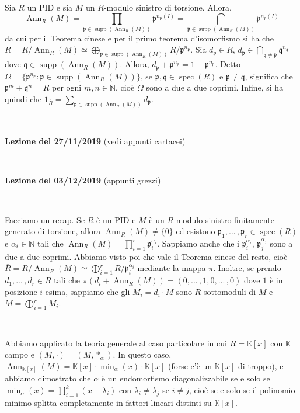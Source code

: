 \documentclass{article}
\theoremstyle{definition}
\newcommand{\Ann}{\operatorname{Ann}}
\newcommand{\spec}{\operatorname{spec}}
\begin{document}
\noindent Sia $R$ un PID e sia $M$ un $R$-modulo sinistro di torsione. Allora, \[\operatorname{Ann}_R(M)=\prod\limits_{\mathfrak{p}\in \operatorname{supp}(\Ann_R(M))} \mathfrak{p}^{n_{\mathfrak{p}}(I)}=\bigcap\limits_{\mathfrak{p}\in \operatorname{supp}(\Ann_R(M))} \mathfrak{p}^{n_{\mathfrak{p}}(I)}\] da cui per il Teorema cinese e per il primo teorema d'isomorfismo si ha che $\overline{R}=R/\Ann_R(M)\simeq \bigoplus\limits_{\mathfrak{p}\in \operatorname{supp}(\Ann_R(M))} R/\mathfrak{p}^{n_{\mathfrak{p}}}$. Sia $d_{\mathfrak{p}}\in \overline{R}$, $d_{\mathfrak{p}}\in \bigcap\limits_{\mathfrak{q}\neq \mathfrak{p}} \mathfrak{q}^{n_{\mathfrak{q}}}$ dove $\mathfrak{q}\in \operatorname{supp}(\Ann_R(M))$. Allora, $d_{\mathfrak{p}}+\mathfrak{p}^{n_{\mathfrak{p}}} = 1+\mathfrak{p}^{n_{\mathfrak{p}}}$. Detto $\Omega=\{ \mathfrak{p}^{n_{\mathfrak{p}}}: \mathfrak{p}\in \operatorname{supp}(\Ann_R(M))\}$, se $\mathfrak{p},\mathfrak{q}\in \spec(R)$ e $\mathfrak{p}\neq \mathfrak{q}$, significa che $\mathfrak{p}^m+\mathfrak{q}^n=R$ per ogni $m,n\in \mathbb{N}$, cioè $\Omega$ sono a due a due coprimi. Infine, si ha quindi che $1_{\overline{R}}=\sum\limits_{\mathfrak{p}\in \operatorname{supp}(\Ann_R(M))} d_{\mathfrak{p}}$.

\
 
\noindent \textbf{Lezione del 27/11/2019} (vedi appunti cartacei)

\

\noindent \textbf{Lezione del 03/12/2019} (appunti grezzi)

\

\noindent Facciamo un recap. Se $R$ è un PID e $M$ è un $R$-modulo sinistro finitamente generato di torsione, allora $\Ann_R(M)\neq \{0\}$ ed esistono $\mathfrak{p}_1,...\,,\mathfrak{p}_r\in \spec(R)$ e $\alpha_i\in \mathbb{N}$ tali che $\Ann_R(M)=\prod\limits_{i=1}^r \mathfrak{p}_i^{\alpha_i}$. Sappiamo anche che i $\mathfrak{p}_i^{\alpha_i}$, $\mathfrak{p}_j^{\alpha_j}$ sono a due a due coprimi. Abbiamo visto poi che vale il Teorema cinese del resto, cioè $\overline{R}=R/\Ann_R(M)\simeq \bigoplus\limits_{i=1}^r R/\mathfrak{p}_i^{\alpha_i}$ mediante la mappa $\pi$. Inoltre, se prendo $d_1,...\,,d_r\in R$ tali che $\pi(d_i+\Ann_R(M))=(0,...\,,1,0,...\,,0)$ dove $1$ è in posizione $i$-esima, sappiamo che gli $M_i=d_i\cdot M$ sono $R$-sottomoduli di $M$ e $M=\bigoplus\limits_{i=1}^r M_i$.

\

\noindent Abbiamo applicato la teoria generale al caso particolare in cui $R=\mathbb{K}[x]$ con $\mathbb{K}$ campo e $(M,\cdot)=(M,\ast_{\alpha})$. In questo caso, $\Ann_{\mathbb{K}[x]}(M)=\mathbb{K}[x]\cdot \min_{\alpha}(x)\cdot \mathbb{K}[x]$ (forse c'è un $\mathbb{K}[x]$ di troppo), e abbiamo dimostrato che $\alpha$ è un endomorfismo diagonalizzabile se e solo se $\min_{\alpha}(x)=\prod\limits_{i=1}^k (x-\lambda_i)$ con $\lambda_i\neq \lambda_j$ se $i\neq j$, cioè se e solo se il polinomio minimo splitta completamente in fattori lineari distinti su $\mathbb{K}[x]$.
\end{document}
